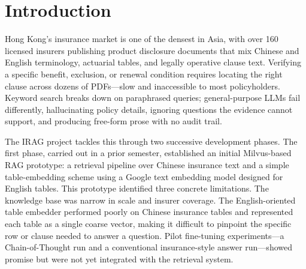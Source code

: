 
\section{Introduction}

Hong Kong's insurance market is one of the densest in Asia, with over 160
licensed insurers publishing product disclosure documents that mix Chinese and
English terminology, actuarial tables, and legally operative clause text.
Verifying a specific benefit, exclusion, or renewal condition requires locating
the right clause across dozens of PDFs---slow and inaccessible to most
policyholders.
Keyword search breaks down on paraphrased queries; general-purpose LLMs fail
differently, hallucinating policy details, ignoring questions the evidence
cannot support, and producing free-form prose with no audit trail.

The IRAG project tackles this through two successive development phases.
The first phase, carried out in a prior semester, established an initial
Milvus-based RAG prototype: a retrieval pipeline over Chinese insurance text
and a simple table-embedding scheme using a Google text embedding model
designed for English tables.
This prototype identified three concrete limitations.
The knowledge base was narrow in scale and insurer coverage.
The English-oriented table embedder performed poorly on Chinese insurance
tables and represented each table as a single coarse vector, making it
difficult to pinpoint the specific row or clause needed to answer a question.
Pilot fine-tuning experiments---a Chain-of-Thought run and a conventional
insurance-style answer run---showed promise but were not yet integrated with
the retrieval system.

